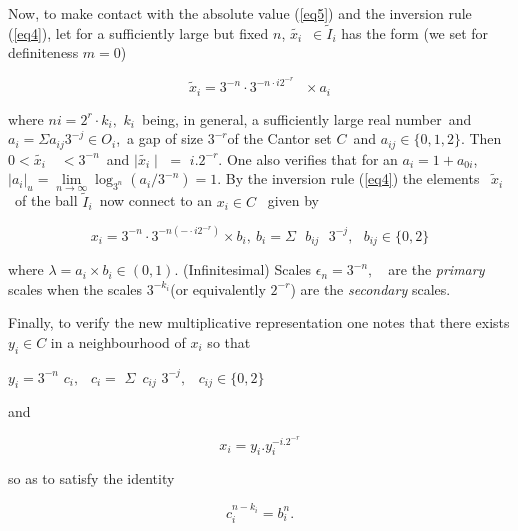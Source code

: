 \documentclass[12pt]{article}
\begin{document}
\vspace{.25cm}

Now, to make contact with the absolute value (\ref{eq5}) and the inversion rule (\ref{eq4}),
let for a sufficiently large but fixed $n$, $\tilde{x_i}$\ $\in \tilde I_{i}$ has
the form (we set for definiteness $m=0$)

\begin{equation}\label{eq10}
\tilde{x}_{i}=3^{-n} \cdot 3^{-n \cdot i2^{-r}}\text{ }\times a_i
\end{equation}

\noindent where $ni=2^{r} \cdot k_{i},$ $k_{i}$\ being, in general, a sufficiently large
real number\ and $a_{i}=\Sigma a_{ij}3^{-j}\in O_{i}$,\ a gap of size $3^{-r}
$of the Cantor set $C$\ and $a_{ij}\in \{0,1,2\}$. Then $0<\tilde{x_i}$\ \ $%
<3^{-n}$\ and $\mid \tilde{x_i}\mid $ $=$ $i.2^{-r}$. One also verifies that for an $a_i=1+a_{0i}$, $|a_i|_u=\underset{n\rightarrow \infty}{\lim}\log_{3^{n}}(a_i/3^{-n})=1$. By the inversion rule (\ref{eq4}) the elements \ $\tilde{x}_{i}$\ of the ball $\tilde I_{i}$\ now connect to an $x_{i}\in C$ \ given by

\begin{equation}\label{eq11}
x_{i}=3^{-n} \cdot 3^{-n(- \cdot i2^{-r})}\times b_i, \ b_i=\Sigma \text{ }b_{ij}\text{ }3^{-j},%
\text{ }b_{ij}\in \{0,2\}
\end{equation}

\noindent where $\lambda =a_i\times b_i \in (0,1).$ (Infinitesimal) Scales $\epsilon _{n}=3^{-n},$\ \
are the \emph{primary} scales when the scales $3^{-k_{i}}$(or equivalently 
$2^{-r}$) are the {\em secondary} scales.

\vspace{.25cm}

Finally, to verify the new multiplicative representation
one notes that there exists $y_{i}\in C$ in a neighbourhood of $x_{i}$ so that \bigskip

\begin{center}
$y_{i}=3^{-n}$ $c_{i},$ $\ \ c_{i}=$ $\Sigma $\ $c_{ij}$ $3^{-j},$ \ $%
c_{ij}\in \{0,2\}$\ 
\end{center}

\noindent and

\begin{equation}\label{eq12}
x_{i}=y_{i}.y_{i}^{-i.2^{-r}}
\end{equation}

\noindent so as to satisfy the identity

\begin{equation}\label{eq13}
c_{i}^{n-k_i}=b_{i}^{n}.
\end{equation}
\end{document}
